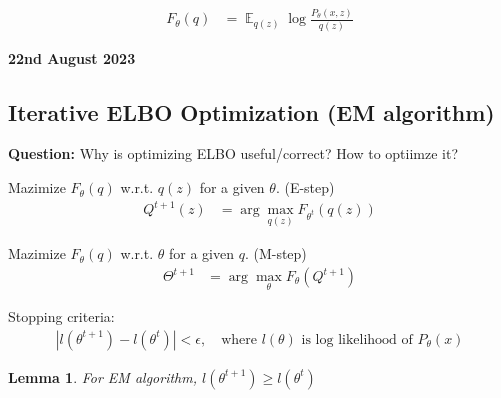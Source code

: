 \documentclass[11pt]{article}
\DeclareMathOperator*{\E}{\mathbb{E}}
\newtheorem{lemma}[theorem]{Lemma}
\begin{document}
\begin{align*}
  F_{\theta}(q) &= \E_{q(z)} \log \frac{P_{\theta}(x, z)}{q(z)} 
\end{align*}

\textbf{22nd August 2023}
\subsection{Iterative ELBO Optimization (EM algorithm)}
\label{sec:iter-elbo-optim}

\textbf{Question:} Why is optimizing ELBO useful/correct? How to optiimze it?

\vspace{1em}
Mazimize $F_{\theta}(q)$ w.r.t. $q(z)$ for a given $\theta$. (E-step)
\begin{align*}
  Q^{t+1}(z) &= \arg\max_{q(z)} F_{\theta^t}(q(z))
\end{align*}

Mazimize $F_{\theta}(q)$ w.r.t. $\theta$ for a given $q$. (M-step)
\begin{align*}
  \Theta^{t+1} &= \arg\max_{\theta} F_{\theta}(Q^{t+1})
\end{align*}

Stopping criteria:
\begin{align*}
  |l(\theta^{t+1}) - l(\theta^t)| < \epsilon, \quad \text{where $l(\theta)$ is log likelihood of $P_{\theta}(x)$}
\end{align*}

\begin{lemma}
  For EM algorithm, $l(\theta^{t+1}) \geq l(\theta^t)$
\end{lemma}
\end{document}
